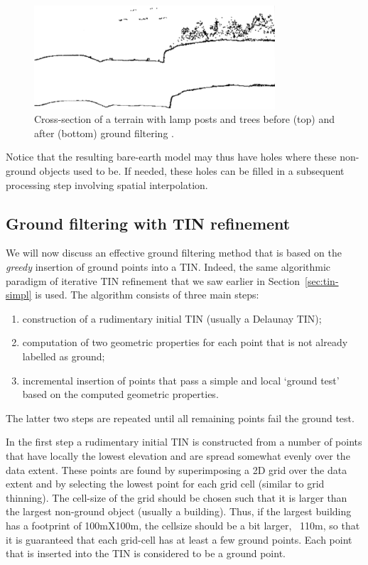 \begin{figure}
  \centering
  \includegraphics[width=0.8\textwidth]{figs/axelsson-profiles.png}
  \caption{Cross-section of a terrain with lamp posts and trees before (top) and after (bottom) ground filtering \citep{axelsson2000generation}.}%
\label{fig:axelsson:profiles}
\end{figure}

Notice that the resulting bare-earth model may thus have holes where these non-ground objects used to be.
If needed, these holes can be filled in a subsequent processing step involving spatial interpolation.

%
\subsection{Ground filtering with TIN refinement}

We will now discuss an effective ground filtering method that is based on the \emph{greedy} insertion of ground points into a TIN\@.
Indeed, the same algorithmic paradigm of iterative TIN refinement that we saw earlier in Section~\ref{sec:tin-simpl} is used.
The algorithm consists of three main steps:
\begin{enumerate}
  \item construction of a rudimentary initial TIN (usually a Delaunay TIN);
  \item computation of two geometric properties for each point that is not already labelled as ground;
  \item incremental insertion of points that pass a simple and local `ground test' based on the computed geometric properties.
\end{enumerate}
The latter two steps are repeated until all remaining points fail the ground test.

In the first step a rudimentary initial TIN is constructed from a number of points that have locally the lowest elevation and are spread somewhat evenly over the data extent.
These points are found by superimposing a 2D grid over the data extent and by selecting the lowest point for each grid cell (similar to grid thinning).
The cell-size of the grid should be chosen such that it is larger than the largest non-ground object (usually a building).
Thus, if the largest building has a footprint of 100mX100m, the cellsize should be a bit larger, \eg\ 110m, so that it is guaranteed that each grid-cell has at least a few ground points.
Each point that is inserted into the TIN is considered to be a ground point.

